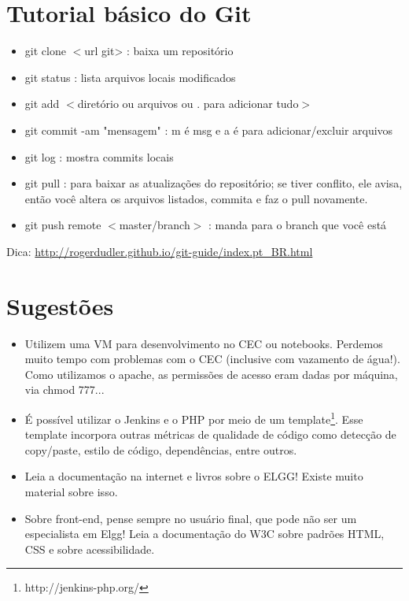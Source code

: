 \documentclass[12pt, letterpaper, onecolumn]{article}
\begin{document}
\section{Tutorial básico do Git}

\begin{itemize}
\item git clone $<$url git> : baixa um repositório
\item git status : lista arquivos locais modificados
\item git add $<$diretório ou arquivos ou . para adicionar tudo$>$
\item git commit -am "mensagem" : m é msg e a é para adicionar/excluir arquivos
\item git log : mostra commits locais
\item git pull : para baixar as atualizações do repositório; se tiver conflito, ele avisa, então você altera os arquivos listados, commita e faz o pull novamente.
\item git push remote $<$master/branch$>$ : manda para o branch que você está
\end{itemize}

Dica: \url{http://rogerdudler.github.io/git-guide/index.pt_BR.html}


\section{Sugestões}

\begin{itemize}
\item Utilizem uma VM para desenvolvimento no CEC ou notebooks. Perdemos muito tempo com problemas com o CEC (inclusive com vazamento de água!). Como utilizamos o apache, as permissões de acesso eram dadas por máquina, via chmod 777...
\item É possível utilizar o Jenkins e o PHP por meio de um template\footnote{http://jenkins-php.org/}. Esse template incorpora outras métricas de qualidade de código como detecção de copy/paste, estilo de código, dependências, entre outros.
\item Leia a documentação na internet e livros sobre o ELGG! Existe muito material sobre isso.
\item Sobre front-end, pense sempre no usuário final, que pode não ser um especialista em Elgg! Leia a documentação do W3C sobre padrões HTML, CSS e sobre acessibilidade.

\end{itemize}
\end{document}
